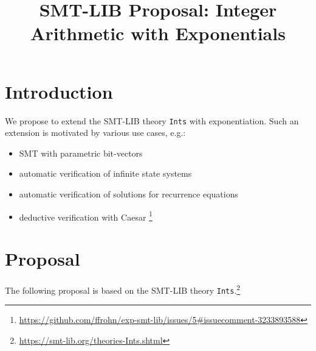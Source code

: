 \documentclass{article}
\title{SMT-LIB Proposal: Integer Arithmetic with Exponentials}
\begin{document}
\maketitle

\section{Introduction}

We propose to extend the SMT-LIB theory {\tt Ints} with exponentiation.
%
Such an extension is motivated by various use cases, e.g.:
%
\begin{itemize}
\item SMT with parametric bit-vectors \cite{bitvec}
\item automatic verification of infinite state systems \cite{swine}
\item automatic verification of solutions for recurrence equations \cite{swine2}
\item deductive verification with Caesar \cite{caesar}\footnote{\url{https://github.com/ffrohn/exp-smt-lib/issues/5\#issuecomment-3233893588}}
\end{itemize}

\section{Proposal}

The following proposal is based on the SMT-LIB theory {\tt Ints}.\footnote{\url{https://smt-lib.org/theories-Ints.shtml}}
\end{document}
